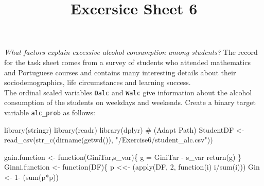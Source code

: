 \documentclass[11pt,]{article}
\title{Excersice Sheet 6}
\author{}
\date{\vspace{-2.5em}}
\newenvironment{Shaded}{}{}
\newcommand{\CommentTok}[1]{\textcolor[rgb]{0.00,0.50,0.00}{#1}}
\newcommand{\ControlFlowTok}[1]{\textcolor[rgb]{0.00,0.00,1.00}{#1}}
\newcommand{\DecValTok}[1]{#1}
\newcommand{\KeywordTok}[1]{\textcolor[rgb]{0.00,0.00,1.00}{#1}}
\newcommand{\NormalTok}[1]{#1}
\newcommand{\OperatorTok}[1]{#1}
\newcommand{\StringTok}[1]{\textcolor[rgb]{0.00,0.50,0.50}{#1}}
\begin{document}
\maketitle

\emph{What factors explain excessive alcohol consumption among
students?} The record for the task sheet comes from a survey of students
who attended mathematics and Portuguese courses and contains many
interesting details about their sociodemographics, life circumstances
and learning success.\\
The ordinal scaled variables \texttt{Dalc} and \texttt{Walc} give
information about the alcohol consumption of the students on weekdays
and weekends. Create a binary target variable \texttt{alc\_prob} as
follows:

\begin{Shaded}
\begin{Highlighting}[]
\KeywordTok{library}\NormalTok{(stringr)}
\KeywordTok{library}\NormalTok{(readr)}
\KeywordTok{library}\NormalTok{(dplyr)}
\CommentTok{# (Adapt Path)}
\NormalTok{ StudentDF <-}\StringTok{ }\KeywordTok{read_csv}\NormalTok{(}\KeywordTok{str_c}\NormalTok{(}\KeywordTok{dirname}\NormalTok{(}\KeywordTok{getwd}\NormalTok{()), }\StringTok{"/Exercise6/student_alc.csv"}\NormalTok{))}
 
\NormalTok{ gain.function <-}\StringTok{ }\ControlFlowTok{function}\NormalTok{(GiniTar,s_var)\{}
\NormalTok{  g =}\StringTok{ }\NormalTok{GiniTar }\OperatorTok{-}\StringTok{ }\NormalTok{s_var}
  \KeywordTok{return}\NormalTok{(g)}
\NormalTok{\}}
\NormalTok{ Ginni.function <-}\StringTok{ }\ControlFlowTok{function}\NormalTok{(DF)\{}
\NormalTok{  p <<-}\StringTok{ }\NormalTok{(}\KeywordTok{apply}\NormalTok{(DF, }\DecValTok{2}\NormalTok{, }\ControlFlowTok{function}\NormalTok{(i) i}\OperatorTok{/}\KeywordTok{sum}\NormalTok{(i)))}
\NormalTok{  Gin <-}\StringTok{ }\DecValTok{1}\OperatorTok{-}\StringTok{ }\NormalTok{(}\KeywordTok{sum}\NormalTok{(p}\OperatorTok{*}\NormalTok{p))}


\end{Highlighting}
\end{Shaded}
\end{document}
